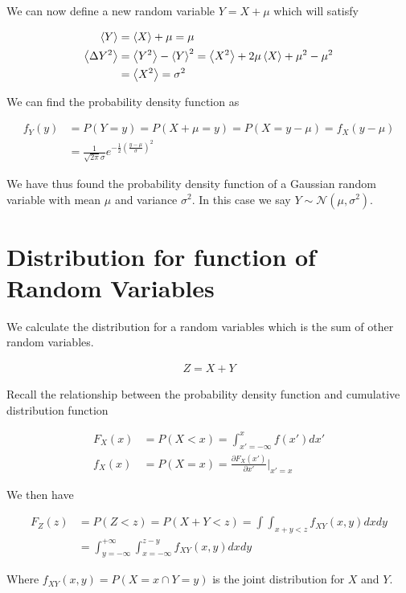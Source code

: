 \documentclass[12pt]{article}
\begin{document}
We can now define a new random variable $Y = X + \mu$ which will satisfy

\begin{align}
\Braket{Y} &= \Braket{X} + \mu = \mu\\
\Braket{\Delta Y^2} &= \Braket{Y^2} - \Braket{Y}^2 = \Braket{X^2} + 2\mu\Braket{X} + \mu^2 - \mu^2\\
&= \Braket{X^2} = \sigma^2
\end{align}

We can find the probability density function as

\begin{align}
f_Y(y) &= P(Y=y) = P(X+\mu=y) = P(X=y-\mu) = f_X(y-\mu)\\
&= \frac{1}{\sqrt{2\pi} \sigma} e^{-\frac{1}{2}\left(\frac{y-\mu}{\sigma} \right)^2}
\end{align}

We have thus found the probability density function of a Gaussian random variable with mean $\mu$ and variance $\sigma^2$. In this case we say $Y \sim \mathcal{N}(\mu,\sigma^2)$.

\section{Distribution for function of Random Variables}

We calculate the distribution for a random variables which is the sum of other random variables.

\begin{align}
Z = X + Y
\end{align}

Recall the relationship between the probability density function and cumulative distribution function

\begin{align}
F_X(x) &= P(X<x) = \int_{x'=-\infty}^x f(x')dx'\\
f_X(x) &= P(X=x) = \frac{\partial F_X(x')}{\partial x'}\Bigg\vert_{x'=x}
\end{align}

We then have

\begin{align}
F_Z(z) &= P(Z<z) = P(X+Y < z) = \int\int_{x+y<z} f_{XY}(x,y) dx dy\\
&= \int_{y=-\infty}^{+\infty}\int_{x=-\infty}^{z-y} f_{XY}(x,y)dxdy
\end{align}

Where $f_{XY}(x,y) = P(X=x \cap Y=y)$ is the joint distribution for $X$ and $Y$.
\end{document}
